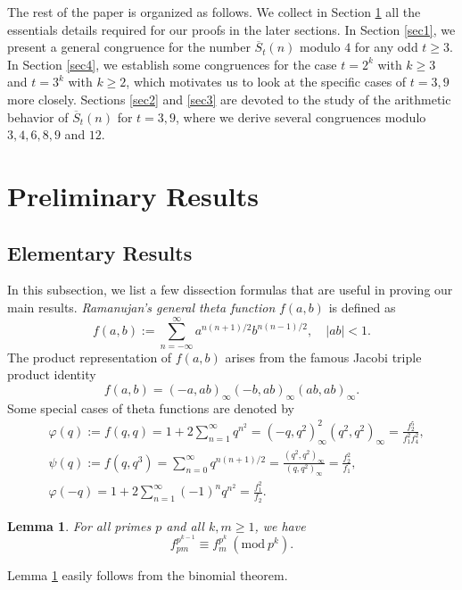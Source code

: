 \documentclass[12pt]{amsart}
\theoremstyle{plain}
\newtheorem{lemma}[theorem]{Lemma}
\theoremstyle{definition}
\begin{document}
The rest of the paper is organized as follows. We collect in Section \ref{sec:prelim} all the essentials details required for our proofs in the later sections. In Section \ref{sec1}, we present a general congruence for the number $\overline{S}_t(n)$ modulo $4$ for any odd $t \geq 3$. In Section \ref{sec4}, we establish some congruences for the case $t=2^k$ with $k\geq 3$ and $t=3^k$ with $k\geq 2$, which motivates us to look at the specific cases of $t=3, 9$ more closely. Sections \ref{sec2} and \ref{sec3} are devoted to the study of the arithmetic behavior of $\overline{S}_t(n)$ for $t=3,9$, where we derive several congruences modulo $3,4,6,8,9$ and $12$. 

\section{Preliminary Results}\label{sec:prelim}

\subsection{Elementary Results}

In this subsection, we list a few dissection formulas that are useful in proving our main results. \emph{Ramanujan's general theta function} $f(a,b)$ \cite[p. 34, 18.1]{Berndt1991} is defined as
\[
f(a,b):=\sum_{n=-\infty}^{\infty}a^{n(n+1)/2}b^{n(n-1)/2}, \quad  |ab| <1.
\]
The product representation of $f(a,b)$ arises from the famous Jacobi triple product identity \cite[p. 35, Entry 19]{Berndt1991}
\[
f(a,b)=(-a,ab)_{\infty}(-b,ab)_{\infty}(ab,ab)_{\infty}.
\]
Some special cases of theta functions are denoted by 
\begin{align*}
&\varphi(q):=f(q,q)=1+2\sum_{n=1}^{\infty}q^{n^{2}}=(-q,q^{2})_{\infty}^{2}(q^{2},q^{2})_{\infty}=\frac{f_{2}^{5}}{f_{1}^{2}f_{4}^{2}}, \\
&\psi(q):=f(q,q^{3})=\sum_{n=0}^{\infty}q^{n(n+1)/2}=\frac{(q^{2},q^{2})_{\infty}}{(q,q^{2})_{\infty}}=\frac{f_{2}^{2}}{f_{1}},\\
& \varphi(-q)=1+2\sum_{n=1}^{\infty} (-1)^{n} q^{n^{2}}=\frac{f_{1}^{2}}{f_{2}}.
\end{align*}

\begin{lemma} \label{binomial} 
For all primes $p$ and all $k, m\geq 1$, we have 
\begin{equation}
 f_{pm}^{p^{k-1}} \equiv f_{m}^{p^{k}}  \ (\mathrm{mod} \ p^{k}). \label{binomiallemma} 
\end{equation}
\end{lemma}
\noindent Lemma \ref{binomial} easily follows from the binomial theorem.
\end{document}
